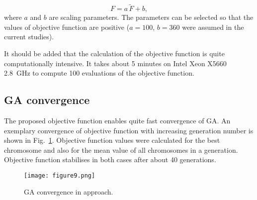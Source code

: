 \begin{equation}
	F = a \,  \tilde{F} + b,
	\end{equation}
where \(a\) and \(b\) are scaling parameters. The parameters can be selected so that the values of  objective function are positive (\(a=100\), \(b=360\) were assumed in the current studies).
	
It should be added that the calculation of the objective function is quite computationally intensive. 
It takes about 5 minutes on Intel Xeon X5660 2.8~GHz to compute 100 evaluations of the objective function. 


\subsection{GA convergence}

The proposed objective function enables quite fast convergence of GA. 
An exemplary convergence of objective function with increasing generation number is shown in Fig.~\ref{fig:GAconvergence}. 
Objective function values were calculated for the best chromosome and also for the mean value of all chromosomes in a generation. 
Objective function stabilises in both cases after about 40 generations.
	
\begin{figure} [h!]
		\centering
	\texttt{[image: figure9.png]}	
\caption{GA convergence in   approach.}
		\label{fig:GAconvergence}
	\end{figure}

	
